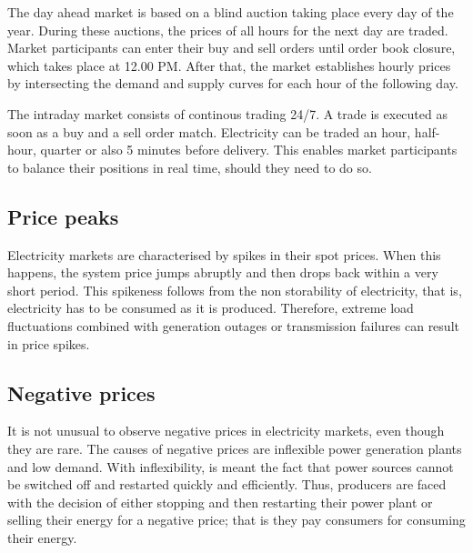 The day ahead market is based on a blind auction taking place every day of the year.
During these auctions, the prices of all hours for the next day are traded.
Market participants can enter their buy and sell orders until order book closure, which takes place at 12.00 PM. After that, the market establishes hourly prices by intersecting the demand and supply curves for each hour of the following day.

The intraday market consists of continous trading 24/7. A trade is executed as soon as a buy and a sell order match. Electricity can be traded an hour, half-hour, quarter or also 5 minutes before delivery. This enables market participants to balance their positions in real time, should they need to do so.

\subsection{Price peaks}
Electricity markets are characterised by spikes in their spot prices. When this happens, the system price jumps abruptly and then drops back within a very short period.
This spikeness follows from the non storability of electricity, that is, electricity has to be consumed as it is produced. Therefore, extreme load fluctuations combined with generation outages or transmission failures can result in price spikes.

\subsection{Negative prices}
It is not unusual to observe negative prices in electricity markets, even though they are rare.
The causes of negative prices are inflexible power generation plants and low demand. With inflexibility, is meant the fact that power sources cannot be switched off and restarted quickly and efficiently.
Thus, producers are faced with the decision of either stopping and then restarting their power plant or selling their energy for a negative price; that is they pay consumers for consuming their energy.

